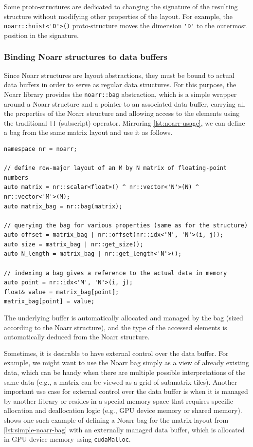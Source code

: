 Some proto-structures are dedicated to changing the signature of the resulting structure without modifying other properties of the layout. For example, the \lstinline{noarr::hoist<'D'>()} proto-structure moves the dimension \lstinline{'D'} to the outermost position in the signature.


\subsubsection{Binding Noarr structures to data buffers}\label{sec:binding-noarr-structures}

Since Noarr structures are layout abstractions, they must be bound to actual data buffers in order to serve as regular data structures. For this purpose, the Noarr library provides the \lstinline{noarr::bag} abstraction, which is a simple wrapper around a Noarr structure and a pointer to an associated data buffer, carrying all the properties of the Noarr structure and allowing access to the elements using the traditional \lstinline{[]} (subscript) operator. Mirroring \cref{lst:noarr-usage}, we can define a bag from the same matrix layout and use it as follows.

\begin{lstlisting}[style=C++, caption={Defining a simple bag from a Noarr structure}, label={lst:simple-noarr-bag}, basicstyle=\ttfamily\scriptsize]
namespace nr = noarr;

// define row-major layout of an M by N matrix of floating-point numbers
auto matrix = nr::scalar<float>() ^ nr::vector<'N'>(N) ^ nr::vector<'M'>(M);
auto matrix_bag = nr::bag(matrix);

// querying the bag for various properties (same as for the structure)
auto offset = matrix_bag | nr::offset(nr::idx<'M', 'N'>(i, j));
auto size = matrix_bag | nr::get_size();
auto N_length = matrix_bag | nr::get_length<'N'>();

// indexing a bag gives a reference to the actual data in memory
auto point = nr::idx<'M', 'N'>(i, j);
float& value = matrix_bag[point];
matrix_bag[point] = value;
\end{lstlisting}

The underlying buffer is automatically allocated and managed by the bag (sized according to the Noarr structure), and the type of the accessed elements is automatically deduced from the Noarr structure.

Sometimes, it is desirable to have external control over the data buffer. For example, we might want to use the Noarr bag simply as a view of already existing data, which can be handy when there are multiple possible interpretations of the same data (e.g., a matrix can be viewed as a grid of submatrix tiles).
Another important use case for external control over the data buffer is when it is managed by another library or resides in a special memory space that requires specific allocation and deallocation logic (e.g., GPU device memory or shared memory).  shows one such example of defining a Noarr bag for the matrix layout from \cref{lst:simple-noarr-bag} with an externally managed data buffer, which is allocated in GPU device memory using \lstinline{cudaMalloc}.

